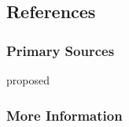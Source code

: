 \subsection{References}

\subsubsection{Primary Sources}

proposed \cite{Zou2005}

\subsubsection{More Information}



